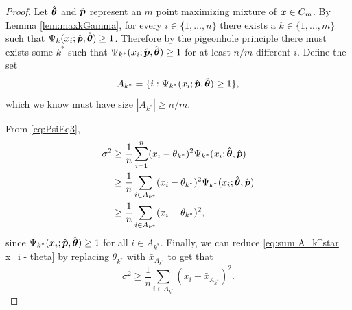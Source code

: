 		\begin{proof}
			Let $\hat{{\bm{{\theta}}}}$ and $\hat{{\bm{{p}}}}$ represent an $m$ point maximizing mixture of ${\bm{{x}}} \in C_m$. By Lemma \ref{lem:maxkGamma}, for every $i \in \{1, \dots, n\}$ there exists a $k \in \{1, \dots, m\}$ such that $\Psi_{k}(x_i;\hat{{\bm{{p}}}},\hat{{\bm{{\theta}}}}) \geq 1$. Therefore by the pigeonhole principle there must exists some $k^*$ such that $\Psi_{k^*}(x_i;\hat{{\bm{{p}}}},\hat{{\bm{{\theta}}}}) \geq 1$ for at least $n / m$ different $i$. Define the set
			\begin{equation}
			 	A_{k^*} = \{i : \Psi_{k^*}(x_i;\hat{{\bm{{p}}}},\hat{{\bm{{\theta}}}}) \geq 1 \},
			\end{equation}
			which we know must have size $|A_{k^*}| \geq n/m$.


			From \eqref{eq:PsiEq3},
			\begin{align}
				\sigma^2 &\geq \frac{1}{n} \sum_{i=1}^n (x_i - \theta_{k^*})^2 \Psi_{k^*}(x_i; \hat{{\bm{{\theta}}}}, \hat{{\bm{{p}}}})\\ 
					&\geq \frac{1}{n} \sum_{i \in A_{k^*}} (x_i - \theta_{k^*})^2 \Psi_{k^*}(x_i; \hat{{\bm{{\theta}}}}, \hat{{\bm{{p}}}})\\
					&\geq \frac{1}{n} \sum_{i \in A_{k^*}} (x_i - \theta_{k^*})^2,
					\label{eq:sum A_k^star x_i - theta}
			\end{align}
			since $\Psi_{k^*}(x_i;\hat{{\bm{{p}}}},\hat{{\bm{{\theta}}}}) \geq 1$ for all $i \in A_{k^*}$. Finally, we can reduce \eqref{eq:sum A_k^star x_i - theta} by replacing $\theta_{k^*}$ with $\bar{x}_{A_{k^*}}$ to get that
			\begin{equation}
				\sigma^2 \geq \frac{1}{n} \sum_{i \in A_{k^*}} \left(x_i - \bar{x}_{A_{k^*}}\right)^2.
			\end{equation}
		\end{proof}

